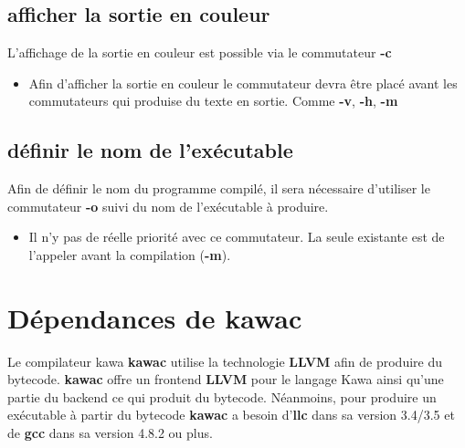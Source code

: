 \documentclass{../res/univ-projet}
\begin{document}
  \subsection{afficher la sortie en couleur}
    L'affichage de la sortie en couleur est possible via le commutateur \textbf{-c}
    \begin{itemize}
        \item Afin d'afficher la sortie en couleur le commutateur devra être placé avant les commutateurs qui produise du texte en sortie. Comme \textbf{-v}, \textbf{-h}, \textbf{-m}
    \end{itemize}

  \subsection{définir le nom de l'exécutable}
    Afin de définir le nom du programme compilé, il sera nécessaire d'utiliser le commutateur \textbf{-o} suivi du nom de l'exécutable à produire.
    \begin{itemize}
        \item Il n'y pas de réelle priorité avec ce commutateur. La seule existante est de l'appeler avant la compilation (\textbf{-m}).
    \end{itemize}
    

 \section{Dépendances de kawac}
  Le compilateur kawa \textbf{kawac} utilise la technologie \textbf{LLVM} afin de produire du bytecode. \textbf{kawac} offre un frontend \textbf{LLVM} pour le langage Kawa ainsi qu'une partie du backend ce qui produit du bytecode. Néanmoins, pour produire un exécutable à partir du bytecode \textbf{kawac} a besoin d'\textbf{llc} dans sa version 3.4/3.5 et de \textbf{gcc} dans sa version 4.8.2 ou plus.
\end{document}
